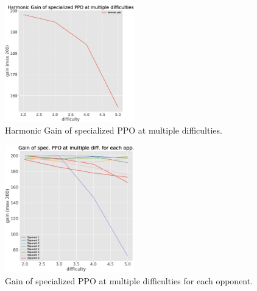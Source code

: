 \documentclass[conference]{IEEEtran}
\begin{document}
    \begin{figure}[htbp]
        \centering
        \includegraphics[width=0.5\textwidth]{images/specialized_ppo_harmonic_gain_per_diff.eps}
        \caption{Harmonic Gain of specialized PPO at multiple difficulties.}
        \label{fig:specialized_ppo_harmonic_gain_per_diff}
    \end{figure}

    \begin{figure}[htbp]
        \centering
        \includegraphics[width=0.5\textwidth]{images/specialized_ppo_gain_per_diff_per_opp.eps}
        \caption{Gain of specialized PPO at multiple difficulties for each opponent.}
        \label{fig:specialized_ppo_gain_per_diff_per_opp}
    \end{figure}
\end{document}

